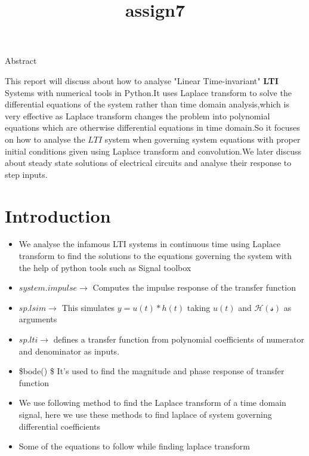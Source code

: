 \documentclass[11pt]{article}
\title{assign7}
\begin{document}
    
    
    \maketitle
    
    

    
    Abstract

 This report will discuss about how to analyse "Linear Time-invariant"
\textbf{LTI} Systems with numerical tools in Python.It uses Laplace
transform to solve the differential equations of the system rather than
time domain analysis,which is very effective as Laplace transform
changes the problem into polynomial equations which are otherwise
differential equations in time domain.So it focuses on how to analyse
the \(LTI\) system when governing system equations with proper initial
conditions given using Laplace transform and convolution.We later
discuss about steady state solutions of electrical circuits and analyse
their response to step inputs.

    \section{Introduction}\label{introduction}

\begin{itemize}
\item
  We analyse the infamous LTI systems in continuous time using Laplace
  transform to find the solutions to the equations governing the system
  with the help of python tools such as Signal toolbox\\
\item
  \(system.impulse \to\) Computes the impulse response of the transfer
  function
\item
  \(sp.lsim \to\) This simulates \(y=u(t)*h(t)\) taking \(u(t)\) and
  \(\mathcal{H(s)}\) as arguments
\item
  \(sp.lti \to\) defines a transfer function from polynomial
  coefficients of numerator and denominator as inputs.
\item
  \$bode() \to \$ It's used to find the magnitude and phase response of
  transfer function
\item
  We use following method to find the Laplace transform of a time domain
  signal, here we use these methods to find laplace of system governing
  differential coefficients
\item
  Some of the equations to follow while finding laplace transform
\end{itemize}
\end{document}
